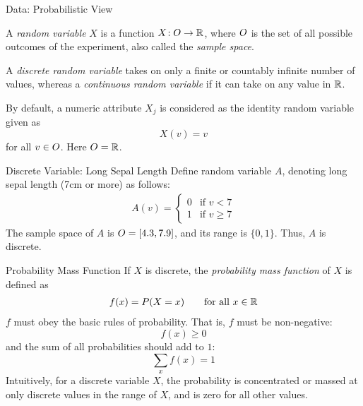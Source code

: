 \begin{frame}{Data: Probabilistic View}

A {\em random variable} $X$ is a function
$X\!: {\relax O} \to {\mathord{\mathbb R}}$, where ${\relax O}$
is the set of all possible outcomes of the experiment, also called the
{\em sample space}.

\smallskip A {\em discrete random variable}
takes on only a f\/{i}nite
or countably inf\/{i}nite number of values, 
whereas a {\em continuous
random variable}
if it can take on any value in ${\mathord{\mathbb R}}$.

\medskip
By default, a numeric attribute $X_j$ 
is considered as the identity random variable given as
$$X(v) = v$$
for all $v \in {\relax O}$. Here ${\relax O} = {\mathord{\mathbb R}}$.

\begin{block}{Discrete Variable: Long Sepal Length}
Define random variable $A$, denoting long sepal length (7cm or more) 
as follows:
    \begin{align*}
        A(v) =
        \begin{cases}
            0 & \text{if } v < 7\\
            1 & \text{if } v \ge 7
        \end{cases}
    \end{align*}
    The sample space of $A$ is ${\relax O} = [4.3, 7.9]$, 
	and its range is $\{0,1\}$. Thus, $A$ is discrete.
\end{block}


\end{frame}

\begin{frame}{Probability Mass Function}
If $X$ is
discrete, the {\em probability mass function} of $X$ is
def\/{i}ned as
\begin{align*}
    f(x) = P(X = x) \qquad \text{for all } x \in {\mathord{\mathbb R}}
\end{align*}
$f$ must obey the basic rules of probability.
That is, $f$ must be non-negative:
$$f(x) \ge 0$$
and the sum of all
probabilities should add to $1$:
$$\sum_{x} f(x) = 1$$
Intuitively, for a discrete variable $X$, 
the probability is
concentrated or massed at only discrete values in the range of $X$,
and is zero for all other values.
\end{frame}




